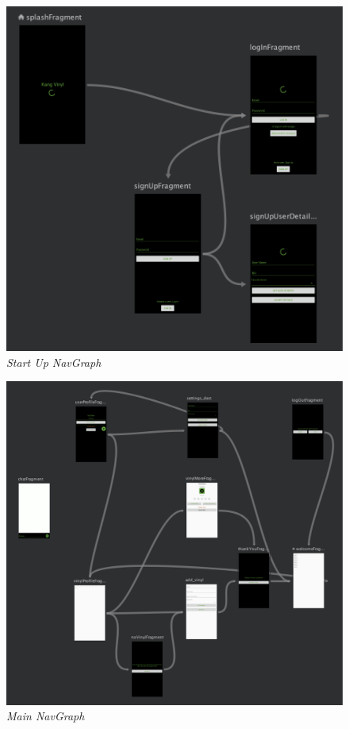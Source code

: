 \begin{figure}[!ht]
\centering
\includegraphics*[width=1
\textwidth]{images/startup.png}
\caption{\em Start Up NavGraph}
\label{img:startup-graph}
\end{figure}

\begin{figure}[!ht]
\centering
\includegraphics*[width=1
\textwidth]{images/main.png}
\caption{\em Main NavGraph}
\label{img:main-graph}
\end{figure}

